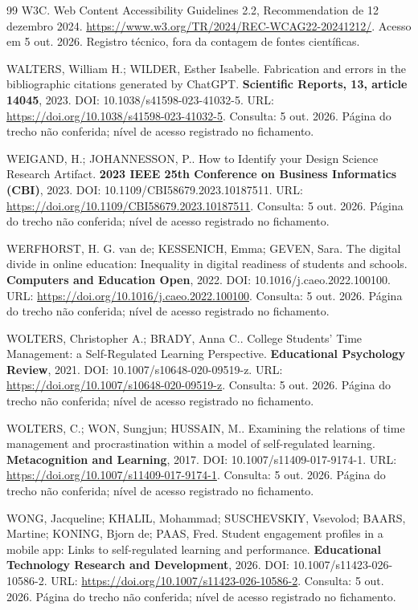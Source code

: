 \begin{thebibliography}{99}
 W3C. Web Content Accessibility Guidelines 2.2, Recommendation de 12 dezembro 2024. \url{https://www.w3.org/TR/2024/REC-WCAG22-20241212/}. Acesso em 5 out. 2026. Registro técnico, fora da contagem de fontes científicas.


 WALTERS, William H.; WILDER, Esther Isabelle. Fabrication and errors in the bibliographic citations generated by ChatGPT. \textbf{Scientific Reports, 13, article 14045}, 2023. DOI: 10.1038/s41598-023-41032-5. URL: \url{https://doi.org/10.1038/s41598-023-41032-5}. Consulta: 5 out. 2026. Página do trecho não conferida; nível de acesso registrado no fichamento.


 WEIGAND, H.; JOHANNESSON, P.. How to Identify your Design Science Research Artifact. \textbf{2023 IEEE 25th Conference on Business Informatics (CBI)}, 2023. DOI: 10.1109/CBI58679.2023.10187511. URL: \url{https://doi.org/10.1109/CBI58679.2023.10187511}. Consulta: 5 out. 2026. Página do trecho não conferida; nível de acesso registrado no fichamento.


 WERFHORST, H. G. van de; KESSENICH, Emma; GEVEN, Sara. The digital divide in online education: Inequality in digital readiness of students and schools. \textbf{Computers and Education Open}, 2022. DOI: 10.1016/j.caeo.2022.100100. URL: \url{https://doi.org/10.1016/j.caeo.2022.100100}. Consulta: 5 out. 2026. Página do trecho não conferida; nível de acesso registrado no fichamento.


 WOLTERS, Christopher A.; BRADY, Anna C.. College Students’ Time Management: a Self-Regulated Learning Perspective. \textbf{Educational Psychology Review}, 2021. DOI: 10.1007/s10648-020-09519-z. URL: \url{https://doi.org/10.1007/s10648-020-09519-z}. Consulta: 5 out. 2026. Página do trecho não conferida; nível de acesso registrado no fichamento.


 WOLTERS, C.; WON, Sungjun; HUSSAIN, M.. Examining the relations of time management and procrastination within a model of self-regulated learning. \textbf{Metacognition and Learning}, 2017. DOI: 10.1007/s11409-017-9174-1. URL: \url{https://doi.org/10.1007/s11409-017-9174-1}. Consulta: 5 out. 2026. Página do trecho não conferida; nível de acesso registrado no fichamento.


 WONG, Jacqueline; KHALIL, Mohammad; SUSCHEVSKIY, Vsevolod; BAARS, Martine; KONING, Bjorn de; PAAS, Fred. Student engagement profiles in a mobile app: Links to self-regulated learning and performance. \textbf{Educational Technology Research and Development}, 2026. DOI: 10.1007/s11423-026-10586-2. URL: \url{https://doi.org/10.1007/s11423-026-10586-2}. Consulta: 5 out. 2026. Página do trecho não conferida; nível de acesso registrado no fichamento.



\end{thebibliography}
